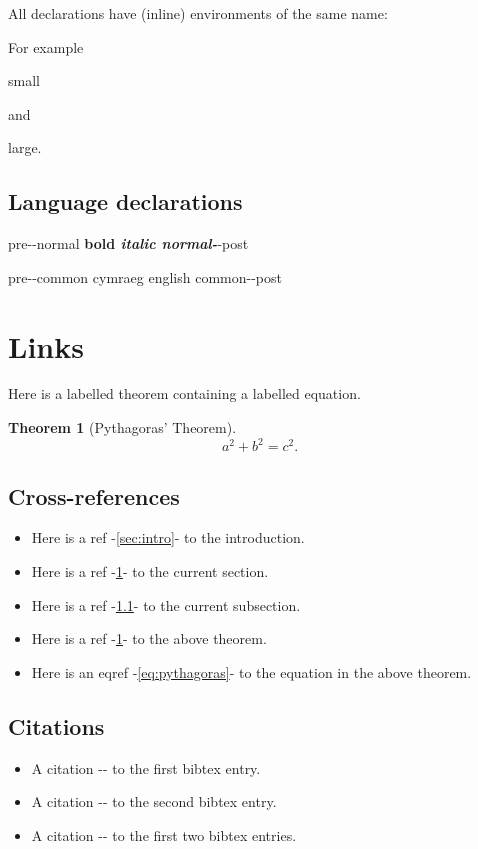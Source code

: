 \documentclass[12pt]{article}
\theoremstyle{plain}
\newtheorem{theo}{Theorem}%
\theoremstyle{definition}
\theoremstyle{remark}
\theoremstyle{mystyle}
\newcommand{\cy}{}
\newcommand{\en}{}
\newcommand{\bi}{}
\begin{document}
All declarations have (inline) environments of the same name:

For example 
\begin{small}
small
\end{small}
and
\begin{large}
large.
\end{large}

\subsection{Language declarations}
\label{ss:language-dec}

pre-{-normal \bf bold \it italic \normalfont normal-}-post

pre-{-common \cy cymraeg \en english \bi common-}-post 



\section{Links}
\label{sec:links}

Here is a labelled theorem containing a labelled equation.
\begin{theo}[Pythagoras' Theorem]\label{thm:pythagoras}
\begin{equation}\label{eq:pythagoras}
a^2 + b^2 = c^2.
\end{equation}
\end{theo}

\subsection{Cross-references}
\label{ss:xrefs}
\begin{itemize}
\item Here is a ref -\ref{sec:intro}- to the introduction.
\item Here is a ref -\ref{sec:links}- to the current section.
\item Here is a ref -\ref{ss:xrefs}- to the current subsection.
\item Here is a ref -\ref{thm:pythagoras}- to the above theorem.
\item Here is an eqref -\eqref{eq:pythagoras}- to the equation in the above theorem.
\end{itemize}

\subsection{Citations}
\begin{itemize}
\item A citation -\cite{grimmett01}- to the first bibtex entry.
\item A citation -\cite{hogg05}- to the second bibtex entry.
\item A citation -\cite{grimmett01,hogg05}- to the first two bibtex entries.
\end{itemize}
\end{document}

